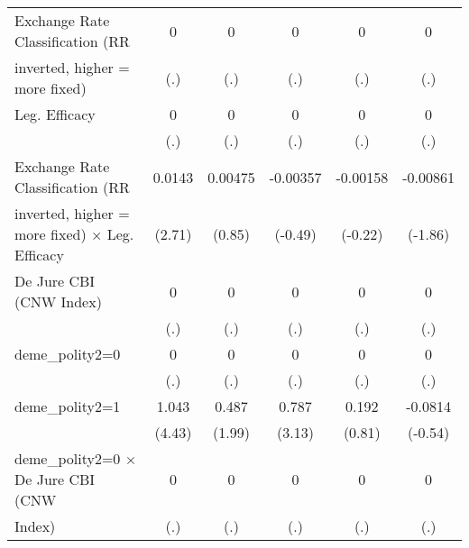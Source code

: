 \begin{table}[htbp]
\begin{tabular}{l*{5}{c}}
\addlinespace
Exchange Rate Classification (RR        &        0         &        0         &        0         &        0         &        0         \\
inverted, higher = more fixed)          &      (.)         &      (.)         &      (.)         &      (.)         &      (.)         \\
\addlinespace
Leg. Efficacy                           &        0         &        0         &        0         &        0         &        0         \\
                                        &      (.)         &      (.)         &      (.)         &      (.)         &      (.)         \\
\addlinespace
Exchange Rate Classification (RR        &   0.0143\sym{**} &  0.00475         & -0.00357         & -0.00158         & -0.00861         \\
inverted, higher = more fixed) $\times$ Leg. Efficacy&   (2.71)         &   (0.85)         &  (-0.49)         &  (-0.22)         &  (-1.86)         \\
\addlinespace
De Jure CBI (CNW Index)                 &        0         &        0         &        0         &        0         &        0         \\
                                        &      (.)         &      (.)         &      (.)         &      (.)         &      (.)         \\
\addlinespace
deme\_polity2=0                          &        0         &        0         &        0         &        0         &        0         \\
                                        &      (.)         &      (.)         &      (.)         &      (.)         &      (.)         \\
\addlinespace
deme\_polity2=1                          &    1.043\sym{***}&    0.487\sym{*}  &    0.787\sym{**} &    0.192         &  -0.0814         \\
                                        &   (4.43)         &   (1.99)         &   (3.13)         &   (0.81)         &  (-0.54)         \\
\addlinespace
deme\_polity2=0 $\times$ De Jure CBI (CNW&        0         &        0         &        0         &        0         &        0         \\
Index)                                  &      (.)         &      (.)         &      (.)         &      (.)         &      (.)         \\

\end{tabular}
\end{table}
